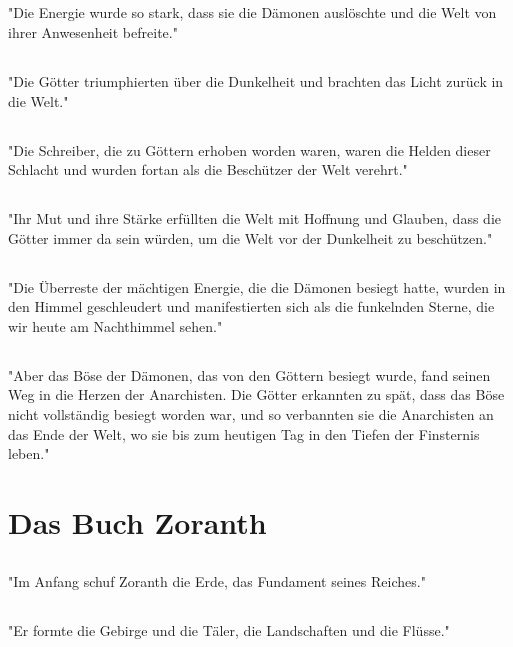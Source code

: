 \documentclass{article}
\begin{document}
\subsection{}
"Die Energie wurde so stark, dass sie die Dämonen auslöschte und die Welt von ihrer Anwesenheit befreite."
\subsection{}
"Die Götter triumphierten über die Dunkelheit und brachten das Licht zurück in die Welt."
\subsection{}
"Die Schreiber, die zu Göttern erhoben worden waren, waren die Helden dieser Schlacht und wurden fortan als die Beschützer der Welt verehrt."
\subsection{}
"Ihr Mut und ihre Stärke erfüllten die Welt mit Hoffnung und Glauben, dass die Götter immer da sein würden, um die Welt vor der Dunkelheit zu beschützen."
\subsection{}
"Die Überreste der mächtigen Energie, die die Dämonen besiegt hatte, wurden in den Himmel geschleudert und manifestierten sich als die funkelnden Sterne, die wir heute am Nachthimmel sehen."
\subsection{}
"Aber das Böse der Dämonen, das von den Göttern besiegt wurde, fand seinen Weg in die Herzen der Anarchisten. Die Götter erkannten zu spät, dass das Böse nicht vollständig besiegt worden war, und so verbannten sie die Anarchisten an das Ende der Welt, wo sie bis zum heutigen Tag in den Tiefen der Finsternis leben."

\section{Das Buch Zoranth}
\subsection{}
"Im Anfang schuf Zoranth die Erde, das Fundament seines Reiches."
\subsection{}
"Er formte die Gebirge und die Täler, die Landschaften und die Flüsse."
\end{document}
